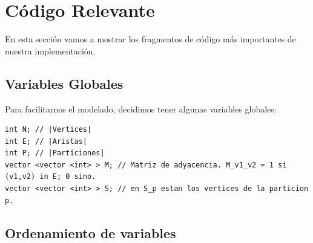 \documentclass[a4paper, 10pt, twoside]{article}
\begin{document}











\newpage

\appendix

\section{Código Relevante}

En esta sección vamos a mostrar los fragmentos de código más importantes de nuestra implementación.

\subsection{Variables Globales}

Para facilitarnos el modelado, decidimos tener algunas variables globales:

\begin{lstlisting}
int N; // |Vertices|
int E; // |Aristas|
int P; // |Particiones|
vector <vector <int> > M; // Matriz de adyacencia. M_v1_v2 = 1 si (v1,v2) in E; 0 sino.
vector <vector <int> > S; // en S_p estan los vertices de la particion p.
\end{lstlisting}

\subsection{Ordenamiento de variables}
\end{document}
